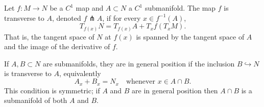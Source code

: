 Let $f: M \to N$ be a $C^1$ map and $A \subset N$ a $C^1$ submanifold. The map $f$ is transverse to $A$, denoted $f \pitchfork A$, if for every $x \in f^{-1}(A)$,
$$T_{f(x)}N = T_{f(x)}A + T_x f(T_x M).$$
That is, the tangent space of $N$ at $f(x)$ is spanned by the tangent space of $A$ and the image of the derivative of $f$.

If $A, B \subset N$ are submanifolds, they are in general position if the inclusion $B \hookrightarrow N$ is transverse to $A$, equivalently
$$A_x + B_x = N_x \quad \text{whenever } x \in A \cap B.$$
This condition is symmetric; if $A$ and $B$ are in general position then $A \cap B$ is a submanifold of both $A$ and $B$.

